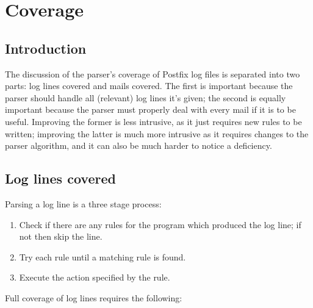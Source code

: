 \documentclass[a4paper,12pt,draft]{article}
\begin{document}
\section{Coverage}

\label{parsing coverage}

\subsection{Introduction}

The discussion of the parser's coverage of Postfix log files is separated
into two parts: log lines covered and mails covered.  The first is
important because the parser should handle all (relevant) log lines it's
given; the second is equally important because the parser must properly
deal with every mail if it is to be useful.  Improving the former is
less intrusive, as it just requires new rules to be written; improving the
latter is much more intrusive as it requires changes to the parser
algorithm, and it can also be much harder to notice a deficiency.

\subsection{Log lines covered}

\label{log-lines-covered}

Parsing a log line is a three stage process:

\begin{enumerate}

    \item Check if there are any rules for the program which produced the
        log line; if not then skip the line.

    \item Try each rule until a matching rule is found.

    \item Execute the action specified by the rule.

\end{enumerate}

Full coverage of log lines requires the following:
\end{document}
